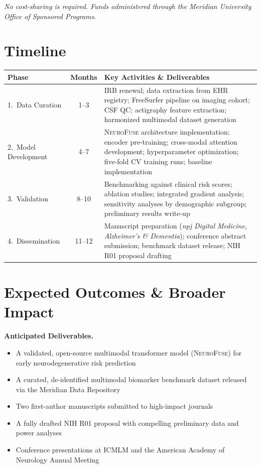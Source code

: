 \documentclass[10pt]{article}
\begin{document}
\vspace{2pt}
{\footnotesize\color{slate!70}\textit{No cost-sharing is required. Funds administered through the Meridian University Office of Sponsored Programs.}}

\section{Timeline}

\begin{tabularx}{\textwidth}{@{} l c >{\raggedright\arraybackslash}X @{}}
  \toprule
  \textbf{Phase} & \textbf{Months} & \textbf{Key Activities \& Deliverables} \\
  \midrule
  1.\ Data Curation & 1--3 &
    IRB renewal; data extraction from EHR registry; FreeSurfer pipeline on imaging cohort; CSF QC; actigraphy feature extraction; harmonized multimodal dataset generation \\
  \midrule
  2.\ Model Development & 4--7 &
    \textsc{NeuroFuse} architecture implementation; encoder pre-training; cross-modal attention development; hyperparameter optimization; five-fold CV training runs; baseline implementation \\
  \midrule
  3.\ Validation & 8--10 &
    Benchmarking against clinical risk scores; ablation studies; integrated gradient analysis; sensitivity analyses by demographic subgroup; preliminary results write-up \\
  \midrule
  4.\ Dissemination & 11--12 &
    Manuscript preparation (\textit{npj Digital Medicine}, \textit{Alzheimer's \& Dementia}); conference abstract submission; benchmark dataset release; NIH R01 proposal drafting \\
  \bottomrule
\end{tabularx}

\section{Expected Outcomes \& Broader Impact}

\begin{highlightbox}
  \small
  \textbf{\color{navy}Anticipated Deliverables.}
  \begin{itemize}[leftmargin=*,itemsep=2pt]
    \item A validated, open-source multimodal transformer model (\textsc{NeuroFuse}) for early neurodegenerative risk prediction
    \item A curated, de-identified multimodal biomarker benchmark dataset released via the Meridian Data Repository
    \item Two first-author manuscripts submitted to high-impact journals
    \item A fully drafted NIH R01 proposal with compelling preliminary data and power analyses
    \item Conference presentations at ICMLM and the American Academy of Neurology Annual Meeting
  \end{itemize}
\end{highlightbox}
\end{document}
